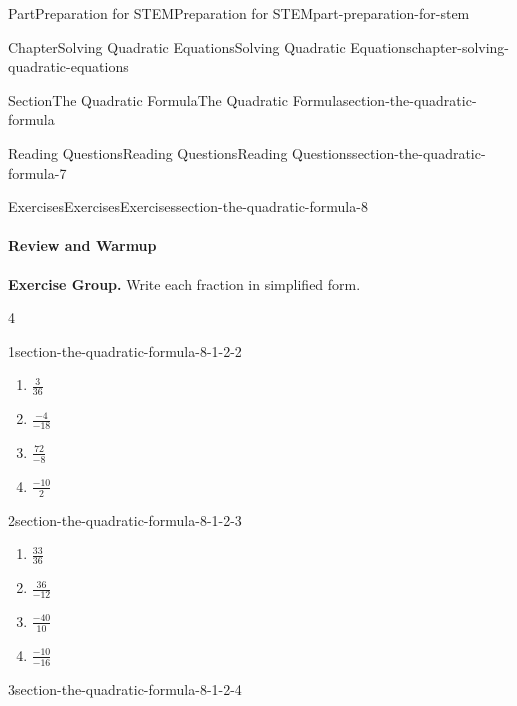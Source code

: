 \documentclass[twoside,10pt,]{book}
\numberwithin{equation}{section}
\begin{document}
\begin{partptx}{Part}{Preparation for STEM}{}{Preparation for STEM}{}{}{part-preparation-for-stem}
\begin{chapterptx}{Chapter}{Solving Quadratic Equations}{}{Solving Quadratic Equations}{}{}{chapter-solving-quadratic-equations}
\begin{sectionptx}{Section}{The Quadratic Formula}{}{The Quadratic Formula}{}{}{section-the-quadratic-formula}
\begin{reading-questions-subsection}{Reading Questions}{Reading Questions}{}{Reading Questions}{}{}{section-the-quadratic-formula-7}
\end{reading-questions-subsection}
%
%
\typeout{************************************************}
\typeout{************************************************}
%
\begin{exercises-subsection}{Exercises}{Exercises}{}{Exercises}{}{}{section-the-quadratic-formula-8}
\paragraph{Review and Warmup}\hypertarget{section-the-quadratic-formula-8-1}{}
\par\medskip\noindent%
\textbf{Exercise Group.}\space\space%
Write each fraction in simplified form.%
\begin{exercisegroupcol}{4}
\begin{divisionexerciseegcol}{1}{}{}{section-the-quadratic-formula-8-1-2-2}%
\begin{enumerate}[font=\bfseries,label=(\alph*),ref=\alph*,topsep=-\parskip, before={\vspace{-\baselineskip}}, after={\vspace{\baselineskip}}]%
\item{}\(\frac{3}{36}\)%
\item{}\(\frac{-4}{-18}\)%
\item{}\(\frac{72}{-8}\)%
\item{}\(\frac{-10}{2}\)%
\end{enumerate}%
\end{divisionexerciseegcol}%
\begin{divisionexerciseegcol}{2}{}{}{section-the-quadratic-formula-8-1-2-3}%
\begin{enumerate}[font=\bfseries,label=(\alph*),ref=\alph*,topsep=-\parskip, before={\vspace{-\baselineskip}}, after={\vspace{\baselineskip}}]%
\item{}\(\frac{33}{36}\)%
\item{}\(\frac{36}{-12}\)%
\item{}\(\frac{-40}{10}\)%
\item{}\(\frac{-10}{-16}\)%
\end{enumerate}%
\end{divisionexerciseegcol}%
\begin{divisionexerciseegcol}{3}{}{}{section-the-quadratic-formula-8-1-2-4}%
\begin{enumerate}[font=\bfseries,label=(\alph*),ref=\alph*,topsep=-\parskip, before={\vspace{-\baselineskip}}, after={\vspace{\baselineskip}}]%

\end{enumerate}
\end{divisionexerciseegcol}
\end{exercisegroupcol}
\end{exercises-subsection}
\end{sectionptx}
\end{chapterptx}
\end{partptx}
\end{document}
